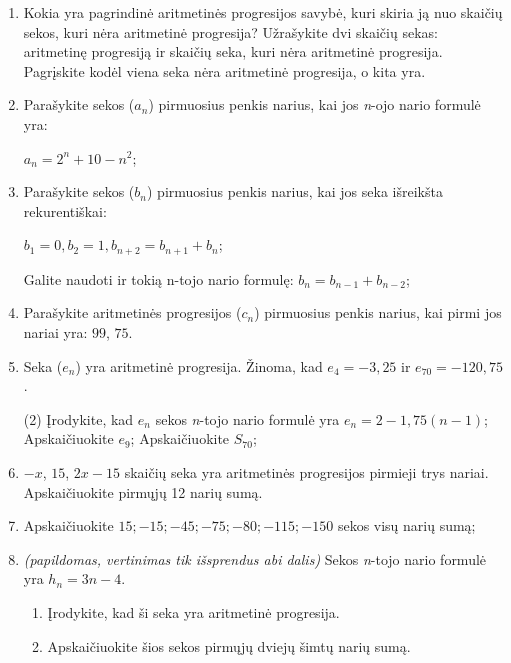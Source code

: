 \documentclass[a4paper]{article}
\begin{document}
\begin{enumerate}
      \item Kokia yra pagrindinė aritmetinės progresijos savybė, kuri skiria ją
            nuo skaičių sekos, kuri nėra aritmetinė progresija? Užrašykite dvi
            skaičių sekas: aritmetinę progresiją ir skaičių seka, kuri nėra
            aritmetinė progresija. Pagrįskite kodėl viena seka nėra
            aritmetinė progresija, o kita yra.

      \item Parašykite sekos ($a_{n}$) pirmuosius penkis
            narius, kai jos \textit{n}-ojo nario formulė yra:

            $a_{n}=2^n+10-n^2$;

      \item Parašykite sekos ($b_{n}$) pirmuosius penkis
            narius, kai jos seka išreikšta rekurentiškai:

            $b_1 = 0, b_2 = 1, b_{n+2}=b_{n+1}+b_{n}$;

            Galite naudoti ir tokią n-tojo nario formulę: 
            $b_{n}=b_{n-1}+b_{n-2}$;

      \item Parašykite aritmetinės progresijos ($c_{n}$) pirmuosius penkis
            narius, kai pirmi jos nariai yra: $99$, $75$.

      \item Seka ($e_{n}$) yra aritmetinė progresija. Žinoma, kad $e_{4}=-3,25$ ir
            $e_{70}=-120,75$.

            \begin{tasks}[item-format={\normalfont}, after-item-skip=2mm](2)
                  \task* Įrodykite, kad $e_{n}$ sekos \textit{n}-tojo nario
                  formulė yra $e_{n}=2-1,75(n-1)$;
                  \task Apskaičiuokite $e_{9}$;
                  \task Apskaičiuokite $S_{70}$;
            \end{tasks}

      \item $ -x $, $ 15 $, $ 2x - 15$ skaičių seka yra aritmetinės progresijos
            pirmieji trys nariai. Apskaičiuokite pirmųjų 12 narių sumą.

      \item Apskaičiuokite $ 15;-15;-45;-75;-80;-115;-150$ sekos visų narių sumą;

      \item \textit{(papildomas, vertinimas tik išsprendus abi dalis)} Sekos
            \textit{n}-tojo nario formulė yra
            $h_{n} = 3n-4$. 
            \begin{enumerate}[label= (\alph*)]
                  \item Įrodykite, kad ši seka yra aritmetinė progresija.
                  \item Apskaičiuokite šios sekos pirmųjų dviejų šimtų narių
                        sumą.
            \end{enumerate}
\end{enumerate}
\end{document}
